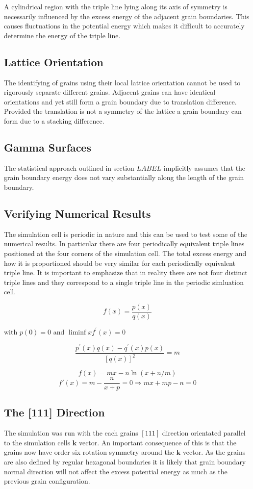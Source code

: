 \documentclass[12pt,a4paper]{book}
\begin{document}
A cylindrical region with the triple line lying along its axis of symmetry is necessarily influenced by the excess energy of the adjacent grain boundaries. This causes fluctuations in the potential energy which makes it difficult to accurately determine the energy of the triple line.
\subsection{Lattice Orientation}

The identifying of grains using their local lattice orientation cannot be used to rigorously separate different grains. Adjacent grains can have identical orientations and yet still form a grain boundary due to translation difference. Provided the translation is not a symmetry of the lattice a grain boundary can form due to a stacking difference.

\subsection{Gamma Surfaces}

The statistical approach outlined in section $LABEL$ implicitly assumes that the grain boundary energy does not vary substantially along the length of the grain boundary.

\subsection{Verifying Numerical Results}

The simulation cell is periodic in nature and this can be used to test some of the numerical results. In particular there are four periodically equivalent triple lines positioned at the four corners of the simulation cell. The total excess energy and how it is proportioned should be very similar for each periodically equivalent triple line. It is important to emphasize that in reality there are not four distinct triple lines and they correspond to a single triple line in the periodic simluation cell.


\[ f(x) = \frac{p(x)}{q(x)} \]

with $p(0)=0$ and $\liminf{x}{f^{\prime}(x)}=0$

\[ \frac{p^{\prime}(x)q(x) -q^{\prime}(x)p(x)}{[q(x)]^2} = m\]


\[ f(x) = mx - n\ln(x+n/m)\]
\[ f'(x) = m -\frac{n}{x+p} = 0 \Rightarrow  mx + mp - n = 0 \]


\subsection{The [111] Direction}
The simulation was run with the each grains $[111]$ direction orientated parallel to the simulation cells $\mathbf{k}$ vector. An important consequence of this is that the grains now have order six rotation symmetry around the $\mathbf{k}$ vector. As the grains are also defined by regular hexagonal boundaries it is likely that grain boundary normal direction will not affect the excess potential energy as much as the previous grain configuration.
\end{document}
